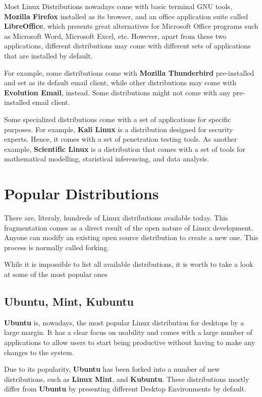 Most Linux Distributions nowadays come with basic terminal \acs{GNU} tools, \textbf{Mozilla Firefox} installed as its browser, and an office application suite called \textbf{LibreOffice}, which presents great alternatives for Microsoft Office programs such as Microsoft Word, Microsoft Excel, etc. However, apart from these two applications, different distributions may come with different sets of applications that are installed by default.

For example, some distributions come with \textbf{Mozilla Thunderbird} pre-installed and set as its default email client, while other distributions may come with \textbf{Evolution Email}, instead. Some distributions might not come with any pre-installed email client.

Some specialized distributions come with a set of applications for specific purposes. For example, \textbf{Kali Linux} is a distribution designed for security experts. Hence, it comes with a set of penetration testing tools. As another example, \textbf{Scientific Linux} is a distribution that comes with a set of tools for mathematical modelling, staristical inferencing, and data analysis.

\section{Popular Distributions}

There are, literaly, hundreds of Linux distributions available today. This fragmentation comes as a direct result of the open nature of Linux development. Anyone can modify an existing open source distribution to create a new one. This process is normally called forking.

While it is impossible to list all available distributions, it is worth to take a look at some of the most popular ones


\subsection{Ubuntu, Mint, Kubuntu}
\textbf{Ubuntu} is, nowadays, the most popular Linux distribution for desktops by a large margin. It has a clear focus on usability and comes with a large number of applications to allow users to start being productive without having to make any changes to the system.

Due to its popularity, \textbf{Ubuntu} has been forked into a number of new distributions, such as \textbf{Linux Mint}, and \textbf{Kubuntu}. These distributions mostly differ from \textbf{Ubuntu} by presenting different Desktop Environments by default.

